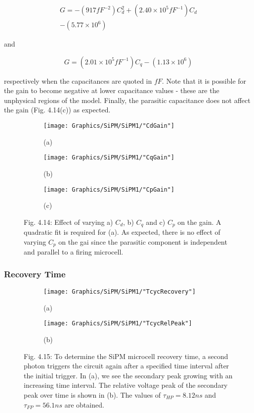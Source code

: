 \begin{multline*}
  G=-(917fF^{-2})C_d^2+(2.40\times 10^5 fF^{-1})C_d \\-(5.77\times 10^6)
\end{multline*}

\noindent and

\[
  G=(2.01\times 10^5 fF^{-1})C_q-(1.13\times 10^6)
\]

\noindent respectively when the capacitances are quoted in $fF$. Note that it is possible for the gain to become negative at lower capacitance values - these are the unphysical regions of the model. Finally, the parasitic capacitance does not affect the gain (Fig. 4.14(c)) as expected.

\begin{figure}[h]
  \centering
  \begin{subfigure}
    \centering
    \texttt{[image: Graphics/SiPM/SiPM1/"CdGain"]}
    \caption*{(a)}
  \end{subfigure}
  \begin{subfigure}
    \centering
    \texttt{[image: Graphics/SiPM/SiPM1/"CqGain"]}
    \caption*{(b)}
  \end{subfigure}
  \begin{subfigure}
    \centering
    \texttt{[image: Graphics/SiPM/SiPM1/"CpGain"]}
    \caption*{(c)}
  \end{subfigure}
  {\caption*{Fig. 4.14: Effect of varying a) $C_d$, b) $C_q$ and c) $C_p$ on the gain. A quadratic fit is required for (a). As expected, there is no effect of varying $C_p$ on the gai since the parasitic component is independent and parallel to a firing microcell.}}
\end{figure}

\subsubsection{Recovery Time}

\begin{figure}[h]
  \centering
  \begin{subfigure}
    \centering
    \texttt{[image: Graphics/SiPM/SiPM1/"TcycRecovery"]}
    \caption*{(a)}
  \end{subfigure}
  \begin{subfigure}
    \centering
    \texttt{[image: Graphics/SiPM/SiPM1/"TcycRelPeak"]}
    \caption*{(b)}
  \end{subfigure}
  {\caption*{Fig. 4.15: To determine the SiPM microcell recovery time, a second photon triggers the circuit again after a specified time interval after the initial trigger. In (a), we see the secondary peak growing with an increasing time interval. The relative voltage peak of the secondary peak over time is shown in (b). The values of $\tau_{HP}=8.12ns$ and $\tau_{FP}=56.1ns$ are obtained.}}
\end{figure}


